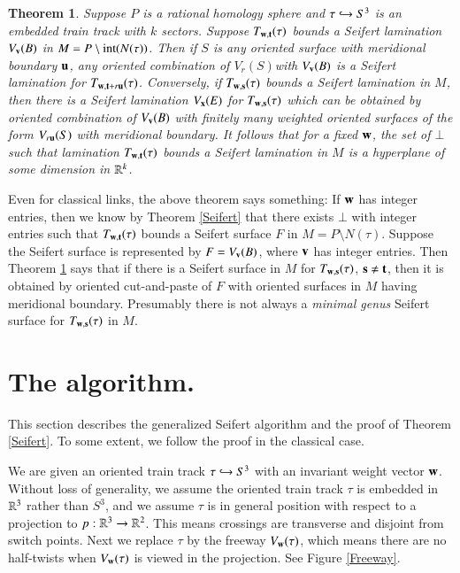 \documentclass[12pt]{article}
\newtheorem{thm}{Theorem}[section] \newtheorem{lemma}[thm]{Lemma}
\theoremstyle{remark}
\begin{document}
  \begin{thm}\label{AllSeifert}  Suppose $P$ is a rational homology sphere and $\tau \hookrightarrow S^3$ is an embedded train track with $k$ sectors.   Suppose $T_{{\bf w},{\bf t}}(\tau)$ bounds a Seifert lamination $V_{\bf v}(B)$ in $M=P\setminus{\rm int}(N(\tau))$.   Then if $S$ is any oriented surface with meridional boundary ${\bf u}$, any oriented combination of $V_r (S)$with $V_{\bf v}(B)$ is a Seifert lamination for $T_{{\bf w},{\bf t}+r{\bf u}}(\tau)$.  Conversely, if $T_{{\bf w},{\bf s}}(\tau)$ bounds a Seifert lamination in $M$, then there is a Seifert lamination $V_{\bf x}(E)$ for $T_{{\bf w},{\bf s}}(\tau)$ which can be obtained by oriented combination of $V_{\bf v}(B)$ with finitely many weighted oriented surfaces of the form $V_{r{\bf u}}(S)$ with meridional boundary.   It follows that for a fixed ${\bf w}$, the set of $\bot$ such that lamination $T_{{\bf w},{\bf t}}(\tau)$  bounds a Seifert lamination in $M$ is a hyperplane of some dimension in $\mathbb R^k$. \end{thm}
  
Even for classical links, the above theorem says something:   If ${\bf w}$ has integer entries, then we know by Theorem \ref{Seifert} that there exists $\bot$ with integer entries such that   $T_{{\bf w},{\bf t}}(\tau)$ bounds a Seifert surface $F$ in $M=P\setminus N(\tau)$.   Suppose the Seifert surface is represented by $F=V_{\bf v}(B)$, where ${\bf v}$ has integer entries.   Then Theorem \ref{AllSeifert} says that if there is a Seifert surface in $M$ for  $T_{{\bf w},{\bf s}}(\tau)$, ${\bf s}\ne {\bf t}$, then it is  obtained by oriented cut-and-paste of $F$ with oriented surfaces in $M$ having meridional boundary.   Presumably there is not always a {\it minimal genus} Seifert surface for $T_{{\bf w},{\bf s}}(\tau)$ in $M$.
 

\section {The algorithm.} \label{algorithm} 

This section describes the generalized Seifert algorithm and the proof of Theorem \ref{Seifert}.
To some extent, we follow the proof in the classical case.

We are given an oriented train track $\tau\hookrightarrow S^3$ with an invariant weight vector ${\bf w}$.     Without loss of generality, we assume the oriented train track $\tau$ is embedded in $\mathbb R^3$ rather than $S^3$, and we assume $\tau$ is  in general position with respect to a projection to $p:\mathbb R^3\to\mathbb R^2$.  This means crossings are transverse and disjoint from switch points.   
Next we replace $\tau$ by the freeway $V_{\bf w}(\tau)$, which means there are no half-twists when $V_{\bf w}(\tau)$ is viewed in the projection.   See Figure \ref{Freeway}.
\end{document}
